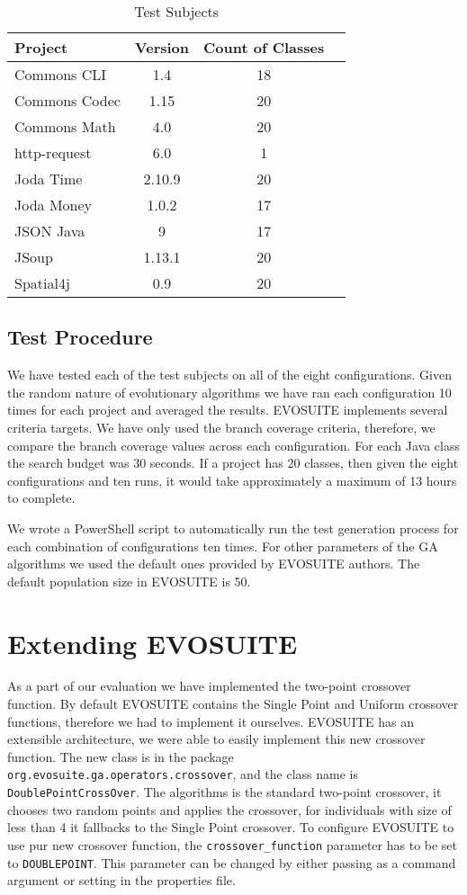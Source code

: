 \documentclass[sigconf]{acmart}
\begin{document}
\begin{table}
  \caption{Test Subjects}
  \label{tab:subjects}
  \begin{tabular}{lccc}
    \toprule
    Project&Version&Count of Classes\\
    \midrule
    Commons CLI   & 1.4    & 18\\
    Commons Codec & 1.15   & 20 \\
    Commons Math  & 4.0    & 20\\
    http-request  & 6.0    & 1 \\
    Joda Time     & 2.10.9 & 20\\
    Joda Money    & 1.0.2  & 17\\
    JSON Java     & 9      & 17\\
    JSoup         & 1.13.1 & 20\\
    Spatial4j     & 0.9    & 20\\
    \bottomrule
  \end{tabular}
\end{table}


\subsection{Test Procedure}
\label{testproc}
We have tested each of the test subjects on all of the eight configurations. Given the random nature 
of evolutionary algorithms we have ran each configuration 10 times for each project and averaged 
the results. EVOSUITE implements several criteria targets. We have only used the branch coverage 
criteria, therefore, we compare the branch coverage values across each configuration. For each Java 
class the search budget was 30 seconds. If a project has 20 classes, then given the eight 
configurations and ten runs, it would take approximately a maximum of 13 hours to complete.

We wrote a PowerShell script to automatically run the test generation process for each combination of
configurations ten times. For other parameters of the GA algorithms we used the default ones provided 
by EVOSUITE authors. The default population size in EVOSUITE is 50.

\section{Extending EVOSUITE}
\label{estending}
As a part of our evaluation we have implemented the two-point crossover function. By default EVOSUITE
contains the Single Point and Uniform crossover functions, therefore we had to implement it ourselves.
EVOSUITE has an extensible architecture, we were able to easily implement this new crossover function.
The new class is in the package \verb|org.evosuite.ga.operators.crossover|, and the class name is
\verb|DoublePointCrossOver|. The algorithms is the standard two-point crossover, it chooses two random 
points and applies the crossover, for individuals with size of less than 4 it fallbacks to 
the Single Point crossover. To configure EVOSUITE to use pur new crossover function, 
the \verb|crossover_function| parameter has to be set to \verb|DOUBLEPOINT|.
This parameter can be changed by either passing as a command argument or setting in the properties file.
\end{document}
